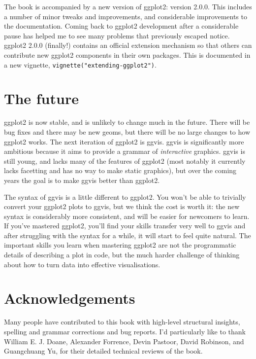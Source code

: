 The book is accompanied by a new version of ggplot2: version 2.0.0. This
includes a number of minor tweaks and improvements, and considerable
improvements to the documentation. Coming back to ggplot2 development
after a considerable pause has helped me to see many problems that
previously escaped notice. ggplot2 2.0.0 (finally!) contains an official
extension mechanism so that others can contribute new ggplot2 components
in their own packages. This is documented in a new vignette,
\texttt{vignette("extending-ggplot2")}.

\section*{The future}

ggplot2 is now stable, and is unlikely to change much in the future.
There will be bug fixes and there may be new geoms, but there will be no
large changes to how ggplot2 works. The next iteration of ggplot2 is
ggvis. ggvis is significantly more ambitious because it aims to provide
a grammar of \emph{interactive} graphics. ggvis is still young, and
lacks many of the features of ggplot2 (most notably it currently lacks
facetting and has no way to make static graphics), but over the coming
years the goal is to make ggvis better than ggplot2.

The syntax of ggvis is a little different to ggplot2. You won't be able
to trivially convert your ggplot2 plots to ggvis, but we think the cost
is worth it: the new syntax is considerably more consistent, and will be
easier for newcomers to learn. If you've mastered ggplot2, you'll find
your skills transfer very well to ggvis and after struggling with the
syntax for a while, it will start to feel quite natural. The important
skills you learn when mastering ggplot2 are not the programmatic details
of describing a plot in code, but the much harder challenge of thinking
about how to turn data into effective visualisations.

\section*{Acknowledgements}

Many people have contributed to this book with high-level structural
insights, spelling and grammar corrections and bug reports. I'd
particularly like to thank William E. J. Doane, Alexander Forrence,
Devin Pastoor, David Robinson, and Guangchuang Yu, for their detailed
technical reviews of the book.

